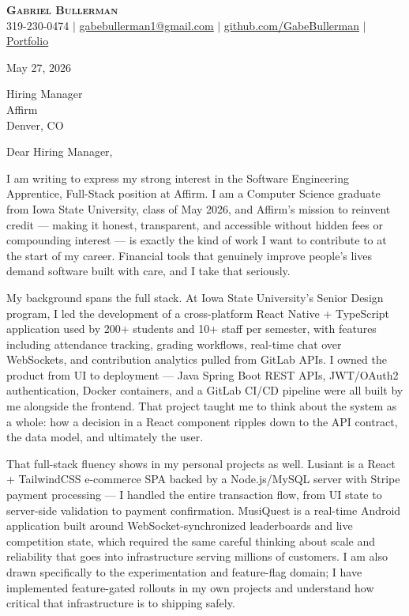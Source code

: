 \documentclass[letterpaper,11pt]{article}
\begin{document}
\begin{center}
    \textbf{\Huge \scshape Gabriel Bullerman} \\ \vspace{1pt}
    \small 319-230-0474 $|$
    \href{mailto:gabebullerman1@gmail.com}{\underline{gabebullerman1@gmail.com}} $|$
    \href{https://github.com/GabeBullerman}{\underline{github.com/GabeBullerman}} $|$
    \href{https://portfolio-8yqn.vercel.app/}{\underline{Portfolio}}
\end{center}

\vspace{4pt}

May 27, 2026

\vspace{4pt}

Hiring Manager \\
Affirm \\
Denver, CO

\vspace{4pt}

Dear Hiring Manager,

I am writing to express my strong interest in the Software Engineering Apprentice, Full-Stack position at Affirm. I am a Computer Science graduate from Iowa State University, class of May 2026, and Affirm's mission to reinvent credit --- making it honest, transparent, and accessible without hidden fees or compounding interest --- is exactly the kind of work I want to contribute to at the start of my career. Financial tools that genuinely improve people's lives demand software built with care, and I take that seriously.

My background spans the full stack. At Iowa State University's Senior Design program, I led the development of a cross-platform React Native + TypeScript application used by 200+ students and 10+ staff per semester, with features including attendance tracking, grading workflows, real-time chat over WebSockets, and contribution analytics pulled from GitLab APIs. I owned the product from UI to deployment --- Java Spring Boot REST APIs, JWT/OAuth2 authentication, Docker containers, and a GitLab CI/CD pipeline were all built by me alongside the frontend. That project taught me to think about the system as a whole: how a decision in a React component ripples down to the API contract, the data model, and ultimately the user.

That full-stack fluency shows in my personal projects as well. Lusiant is a React + TailwindCSS e-commerce SPA backed by a Node.js/MySQL server with Stripe payment processing --- I handled the entire transaction flow, from UI state to server-side validation to payment confirmation. MusiQuest is a real-time Android application built around WebSocket-synchronized leaderboards and live competition state, which required the same careful thinking about scale and reliability that goes into infrastructure serving millions of customers. I am also drawn specifically to the experimentation and feature-flag domain; I have implemented feature-gated rollouts in my own projects and understand how critical that infrastructure is to shipping safely.
\end{document}

